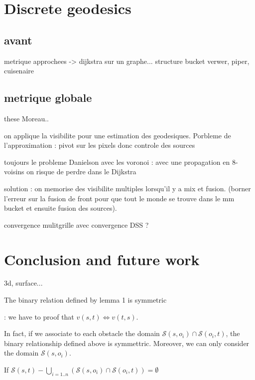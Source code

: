 \documentclass{llncs}
\begin{document}
\section{Discrete geodesics}

\subsection{avant}
metrique approchees -> dijkstra sur un graphe...
structure bucket
verwer, piper, cuisenaire


\subsection{metrique globale}

these Moreau..

on applique la visibilite pour une estimation des geodesiques.
Porbleme de l'approximation : pivot sur les pixels donc controle des sources 

toujours le probleme Danielson avec les voronoi : avec une propagation en 8-voisins on risque de
perdre dans le Dijkstra

solution : on memorise des visibilite multiples lorsqu'il y a mix et fusion. (borner l'erreur sur la
fusion de front pour que tout le monde se trouve dans le mm bucket et ensuite fusion des sources).




convergence mulitgrille avec convergence DSS ?


\section{Conclusion and future work}

3d, surface...





\begin{lem}
The binary relation defined by lemma 1 is symmetric
\end{lem}

: we have to proof that $v(s,t) \Leftrightarrow v(t,s)$.

In fact, if we associate to each obstacle the domain $\mathcal{S}(s,o_i)\cap\mathcal{S}(o_i,t)$,
the binary relationship defined above is symmettric. Moreover, we can only consider the domain
$\mathcal{S}(s,o_i)$.

If $\mathcal{S}(s,t) - \bigcup_{i=1..n}\left(\mathcal{S}(s,o_i)\cap\mathcal{S}(o_i,t)\right )=\emptyset $
\end{document}
